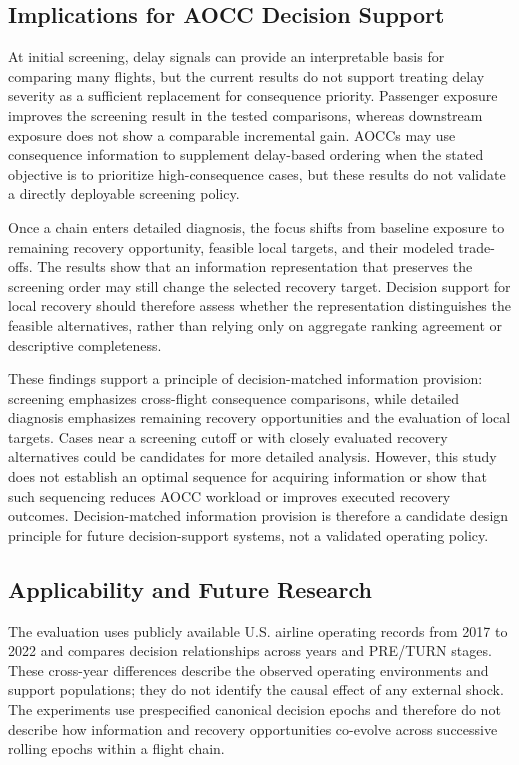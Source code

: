 \subsection{Implications for AOCC Decision Support}
\label{subsec:managerial_implications}

At initial screening, delay signals can provide an interpretable basis for comparing many flights, but the current results do not support treating delay severity as a sufficient replacement for consequence priority. Passenger exposure improves the screening result in the tested comparisons, whereas downstream exposure does not show a comparable incremental gain. AOCCs may use consequence information to supplement delay-based ordering when the stated objective is to prioritize high-consequence cases, but these results do not validate a directly deployable screening policy.

Once a chain enters detailed diagnosis, the focus shifts from baseline exposure to remaining recovery opportunity, feasible local targets, and their modeled trade-offs. The results show that an information representation that preserves the screening order may still change the selected recovery target. Decision support for local recovery should therefore assess whether the representation distinguishes the feasible alternatives, rather than relying only on aggregate ranking agreement or descriptive completeness.

These findings support a principle of decision-matched information provision: screening emphasizes cross-flight consequence comparisons, while detailed diagnosis emphasizes remaining recovery opportunities and the evaluation of local targets. Cases near a screening cutoff or with closely evaluated recovery alternatives could be candidates for more detailed analysis. However, this study does not establish an optimal sequence for acquiring information or show that such sequencing reduces AOCC workload or improves executed recovery outcomes. Decision-matched information provision is therefore a candidate design principle for future decision-support systems, not a validated operating policy.

\subsection{Applicability and Future Research}
\label{subsec:boundary_conditions}

The evaluation uses publicly available U.S. airline operating records from 2017 to 2022 and compares decision relationships across years and PRE/TURN stages. These cross-year differences describe the observed operating environments and support populations; they do not identify the causal effect of any external shock. The experiments use prespecified canonical decision epochs and therefore do not describe how information and recovery opportunities co-evolve across successive rolling epochs within a flight chain.

